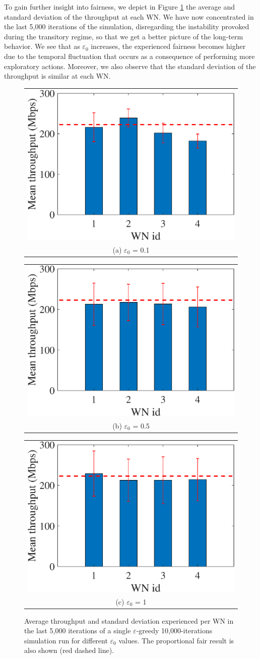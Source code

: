 \documentclass[10pt,journal,compsoc]{IEEEtran}
\begin{document}
	To gain further insight into fairness, we depict in Figure \ref{fig:eg_avg_tpt} the average  and standard deviation of the throughput at each WN. We have now concentrated in the last 5,000 iterations of the simulation, disregarding the instability provoked during the transitory regime, so that we get a better picture of the long-term behavior. We see that as $\varepsilon_0$ increases, the experienced fairness becomes higher due to the temporal fluctuation that occurs as a consequence of performing more exploratory actions. Moreover, we also observe that the standard deviation of the throughput is similar at each WN.  
	\begin{figure}
		\centering
		\begin{tabular}{@{}c@{}}
			\includegraphics[width=.25\textwidth]{images/NEW_mean_tpt_e-greedy_e01} \\[\abovecaptionskip]
			\small (a) $\varepsilon_0$ = 0.1
			\label{fig:eg_e01_avg_tpt}
		\end{tabular}	
		\hspace{\floatsep}	
		\begin{tabular}{@{}c@{}}
			\includegraphics[width=.25\textwidth]{images/NEW_mean_tpt_e-greedy_e05} \\[\abovecaptionskip]
			\small (b) $\varepsilon_0$ = 0.5
			\label{fig:eg_e05_avg_tpt}
		\end{tabular}
		\hspace{\floatsep}
		\begin{tabular}{@{}c@{}}
			\includegraphics[width=.25\textwidth]{images/NEW_mean_tpt_e-greedy_e1} \\[\abovecaptionskip]
			\small (c) $\varepsilon_0$ = 1
			\label{fig:eg_e1_avg_tpt}
		\end{tabular}
		\caption{Average throughput and standard deviation experienced per WN in the last 5,000 iterations of a single $\varepsilon$-greedy 10,000-iterations simulation run for different $\varepsilon_0$ values. The proportional fair result is also shown (red dashed line).}
		\label{fig:eg_avg_tpt}
	\end{figure}
	
\end{document}
